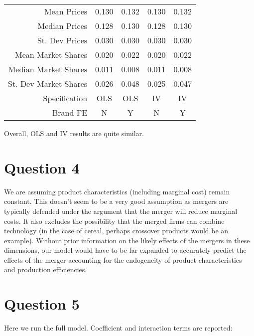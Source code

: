 \documentclass[11pt]{article} %
\begin{document}
\begin{center}
\begin{tabular}{r |c c c c}
\hline \hline
Mean Prices & 0.130 & 0.132 & 0.130 & 0.132 \\
Median Prices & 0.128 & 0.130 & 0.128 & 0.130 \\
St. Dev Prices & 0.030 & 0.030 & 0.030 & 0.030 \\
Mean Market Shares & 0.020 & 0.022 & 0.020 & 0.022 \\
Median Market Shares & 0.011 & 0.008 & 0.011 & 0.008 \\
St. Dev Market Shares & 0.026 & 0.048 & 0.025 & 0.047 \\
\hline
Specification & OLS & OLS & IV & IV \\
Brand FE & N & Y & N & Y \\
\hline
\end{tabular}
\end{center}

Overall, OLS and IV results are quite similar.

\section{Question 4}

We are assuming product characteristics (including marginal cost) remain constant. This doesn't seem to be a very good assumption as mergers are typically defended under the argument that the merger will reduce marginal costs. It also excludes the possibility that the merged firms can combine technology (in the case of cereal, perhaps crossover products would be an example). Without prior information on the likely effects of the mergers in these dimensions, our model would have to be far expanded to accurately predict the effects of the merger accounting for the endogeneity of product characteristics and production efficiencies.

\section{Question 5}

Here we run the full model. Coefficient and interaction terms are reported:
\end{document}
